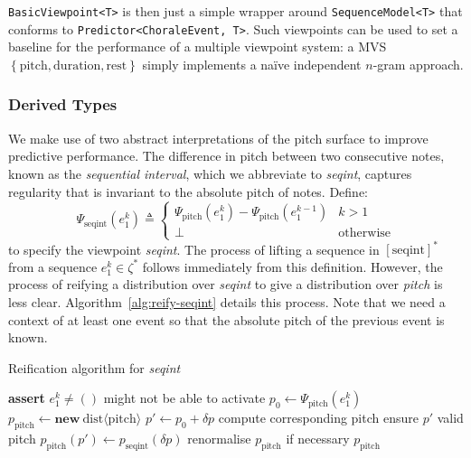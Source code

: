 \documentclass[12pt,a4paper,twoside,openright]{report}
\newcommand{\set}[1]{ \left\{ #1 \right\} }
\begin{document}
\texttt{BasicViewpoint<T>} is then just a simple wrapper around
\texttt{SequenceModel<T>} that conforms to \texttt{Predictor<ChoraleEvent, T>}.
Such viewpoints can be used to set a baseline for the performance of a multiple
viewpoint system: a MVS $\set{\mathrm{pitch}, \mathrm{duration}, \mathrm{rest}}$
simply implements a naïve independent $n$-gram approach.

\subsubsection{Derived Types}

We make use of two abstract interpretations of the pitch surface to improve
predictive performance. The difference in pitch between two consecutive notes,
known as the \emph{sequential interval}, which we abbreviate to \emph{seqint},
captures regularity that is invariant to the absolute pitch of notes. Define:
$$ \Psi_{\mathrm{seqint}}(e_1^k) \triangleq \begin{cases}
  \Psi_{\mathrm{pitch}}(e_1^k) - \Psi_{\mathrm{pitch}}(e_1^{k-1}) & k > 1 \\
  \bot & \text{otherwise} 
\end{cases}
$$
to specify the viewpoint \emph{seqint}. The process of lifting a sequence in
$[\mathrm{seqint}]^*$ from a sequence $e_1^k \in \zeta^*$ follows immediately
from this definition. However, the process of reifying a distribution over
\emph{seqint} to give a distribution over \emph{pitch} is less clear.
Algorithm~\ref{alg:reify-seqint} details this process. Note that we need a
context of at least one event so that the absolute pitch of the previous event
is known.

\begin{algorithm}[H]
  \caption{Reification algorithm for \emph{seqint}}
  \label{alg:reify-seqint}
  \begin{algorithmic}[1]
      \State \textbf{assert} $e_1^k \neq ()$
      \Comment might not be able to activate
      \State $p_0 \gets \Psi_{\mathrm{pitch}}(e_1^k)$
      \State $p_{\mathrm{pitch}} \gets \textbf{new}\
      \mathrm{dist}\langle\mathrm{pitch}\rangle$
        \State $p' \gets p_0 + \delta p$
        \Comment compute corresponding pitch
          \Comment ensure $p'$ valid pitch
          \State $p_{\mathrm{pitch}}(p') \gets p_{\mathrm{seqint}}(\delta p)$
        \EndIf
      \EndFor
      \State renormalise $p_{\mathrm{pitch}}$ if necessary
      \State \Return $p_{\mathrm{pitch}}$
    \EndFunction
  \end{algorithmic}
\end{algorithm}
\end{document}
